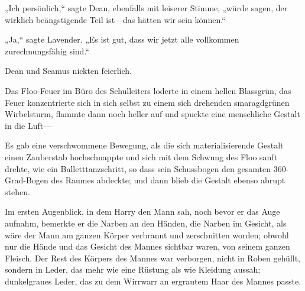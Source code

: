 „Ich persönlich,“ sagte Dean, ebenfalls mit leiserer Stimme, „würde sagen, der wirklich beängstigende Teil ist—das hätten wir sein können.“

„Ja,“ sagte Lavender. „Es ist gut, dass wir jetzt alle vollkommen zurechnungsfähig sind.“

Dean und Seamus nickten feierlich.


Das Floo-Feuer im Büro des Schulleiters loderte in einem hellen Blassgrün, das Feuer konzentrierte sich in sich selbst zu einem sich drehenden smaragdgrünen Wirbelsturm, flammte dann noch heller auf und spuckte eine menschliche Gestalt in die Luft—

Es gab eine verschwommene Bewegung, als die sich materialisierende Gestalt einen Zauberstab hochschnappte und sich mit dem Schwung des Floo sanft drehte, wie ein Balletttanzschritt, so dass sein Schussbogen den gesamten 360-Grad-Bogen des Raumes abdeckte; und dann blieb die Gestalt ebenso abrupt stehen.

Im ersten Augenblick, in dem Harry den Mann sah, noch bevor er das Auge aufnahm, bemerkte er die Narben an den Händen, die Narben im Gesicht, als wäre der Mann am ganzen Körper verbrannt und zerschnitten worden; obwohl nur die Hände und das Gesicht des Mannes sichtbar waren, von seinem ganzen Fleisch. Der Rest des Körpers des Mannes war verborgen, nicht in Roben gehüllt, sondern in Leder, das mehr wie eine Rüstung als wie Kleidung aussah; dunkelgraues Leder, das zu dem Wirrwarr an ergrautem Haar des Mannes passte.


